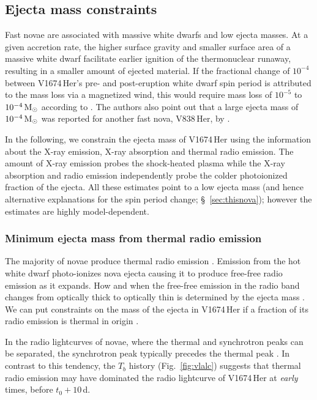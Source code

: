 \documentclass[a4paper,fleqn,usenatbib]{mnras}
\newcommand{\nova}{V1674\,Her}
\begin{document}
\subsection{Ejecta mass constraints}
\label{sec:ejmassconstr}

Fast novae are associated with massive white dwarfs and low ejecta masses. 
At a given accretion rate, the higher surface gravity and smaller surface area
of a massive white dwarf facilitate earlier ignition of the thermonuclear
runaway, resulting in a smaller amount of ejected material. 
If the fractional change of $10^{-4}$ between \nova{}'s pre- and post-eruption white
dwarf spin period is attributed to the mass loss via a magnetized wind, this
would require mass loss of $10^{-5}$ to $10^{-4}\, {\rm M}_\odot$ according
to \cite{2021ApJ...922L..42D}. The authors also point out that a large
ejecta mass of $10^{-4}\, {\rm M}_\odot$ was reported for another fast nova,
V838\,Her, by \cite{1996MNRAS.282..563V}. 

In the following, we constrain the ejecta mass of \nova{} using the information 
about the X-ray emission, X-ray absorption and thermal radio emission.
The amount of X-ray emission probes the shock-heated plasma while 
the X-ray absorption and radio emission independently probe 
the colder photoionized fraction of the ejecta. All these estimates point to 
a low ejecta mass (and hence alternative explanations for the spin
period change; \S~\ref{sec:thisnova}); however the estimates are highly model-dependent.

\subsubsection{Minimum ejecta mass from thermal radio emission}
\label{sec:radiomass}

The majority of novae produce thermal radio emission \citep{2021ApJS..257...49C}.
Emission from the hot white dwarf photo-ionizes nova ejecta causing it to produce free-free radio emission 
as it expands. How and when the free-free emission in the radio band changes from optically thick to optically thin 
is determined by the ejecta mass \citep{2015ApJ...803...76C}.
We can put constraints on the mass of the ejecta in \nova{} if a fraction of 
its radio emission is thermal in origin \citep[e.g.][]{1996ASPC...93..174H,2016MNRAS.457..887W}.

In the radio lightcurves of novae, where the thermal and synchrotron peaks can be separated, 
the synchrotron peak typically precedes the thermal peak \citep{2016MNRAS.457..887W,2018ApJ...852..108F,2021ApJS..257...49C}.
In contrast to this tendency, the $T_b$ history (Fig.~\ref{fig:vlalc})
suggests that
thermal radio emission may have dominated the radio lightcurve
of \nova{} at {\em early} times, before $t_0+10$\,d.
\end{document}
